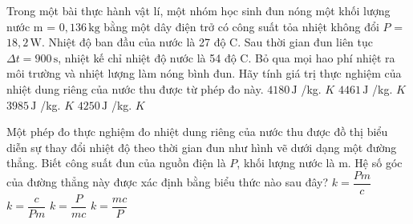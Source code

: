 \begin{ex}
Trong một bài thực hành vật lí, một nhóm học sinh đun nóng một khối lượng nước m = $0,136\,\text{kg}$ bằng một dây điện trở có công suất tỏa nhiệt không đổi $P$ = $18,2\,\text{W}$. Nhiệt độ ban đầu của nước là 27 độ C. Sau thời gian đun liên tục $\Delta t = 900\,\text{s}$, nhiệt kế chỉ nhiệt độ nước là 54 độ C. Bỏ qua mọi hao phí nhiệt ra môi trường và nhiệt lượng làm nóng bình đun. Hãy tính giá trị thực nghiệm của nhiệt dung riêng của nước thu được từ phép đo này.
\choice
{$4180\,\text{J}$ /kg. $K$}
{\True $4461\,\text{J}$ /kg. $K$}
{$3985\,\text{J}$ /kg. $K$}
{$4250\,\text{J}$ /kg. $K$}
\end{ex}

\begin{ex}
Một phép đo thực nghiệm đo nhiệt dung riêng của nước thu được đồ thị biểu diễn sự thay đổi nhiệt độ theo thời gian đun như hình vẽ dưới dạng một đường thẳng. Biết công suất đun của nguồn điện là $P$, khối lượng nước là m. Hệ số góc của đường thẳng này được xác định bằng biểu thức nào sau đây?
\choice
{$k=\dfrac{Pm}{c}$}
{$k=\dfrac{c}{Pm}$}
{\True $k=\dfrac{P}{mc}$}
{$k=\dfrac{mc}{P}$}
\end{ex}

